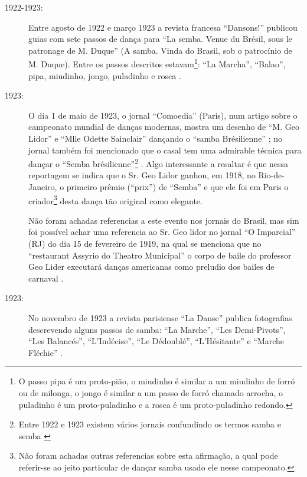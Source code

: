 \begin{description}
\item[1922-1923:] Entre agosto de 1922 e março 1923 a revista francesa ``Dansons!'' 
publicou guias com sete passos de dança para 
``La semba. Venue du Brésil, sous le patronage de M. Duque'' (A samba. Vinda do Brasil, sob o patrocínio de M. Duque).
Entre os passos descritos estavam\footnote{O passo pipa é um proto-pião, 
o miudinho é similar a um miudinho de forró ou de milonga,
o jongo é similar a um passo de forró chamado arrocha,
o puladinho é um proto-puladinho e 
a rosca é um proto-puladinho redondo.
}: 
``La Marcha'', %
``Balao'', 
pipa, %
miudinho, %
jongo, %
puladinho e %
rosca %
\cite[pp. 3]{Dansons:12} \cite[pp. 3]{Dansons:13} \cite[pp. 3]{Dansons:14} \cite[pp. 3]{Dansons:15} \cite[pp. 7]{Dansons:25}.

\item[1923:] O dia 1 de maio de 1923, o jornal ``Comoedia'' (Paris),
num artigo sobre o campeonato mundial de danças modernas,  
mostra um desenho de ``M. Geo Lidor'' e ``Mlle Odette Sainclair'' 
dançando o ``samba Brésilienne'' \cite[pp. 1]{Comoedia:1923:maio:1}; 
no jornal também foi mencionado que o casal tem uma admirable técnica para dançar o 
``Semba brésilienne''\footnote{Entre 1922 e 1923 existem vários jornais 
confundindo os termos samba e semba \cite[pp. 1-2]{Comoedia:1923:maio:1}} \cite[pp. 2]{Comoedia:1923:maio:1}.
Algo interessante a resaltar é que nessa reportagem se indica 
que o Sr. Geo Lidor ganhou, em 1918, 
no Rio-de-Janeiro, o primeiro prêmio (``prix'') de ``Semba'' e que 
ele foi em Paris o criador\footnote{Não foram achadas outras referencias sobre esta afirmação, 
a qual pode referir-se ao jeito particular de dançar samba usado ele nesse campeonato.} desta dança tão original como elegante.

Não foram achadas referencias a este evento nos jornais do Brasil, mas
sim foi possível achar uma referencia ao Sr. Geo lidor
no jornal ``O Imparcial''  (RJ)
do dia 15 de fevereiro de 1919, na qual se menciona que
no ``restaurant Assyrio do Theatro Municipal''
o corpo de baile do professor Geo Lider executará danças americanas 
como preludio dos bailes de carnaval \cite[pp. 7]{Imparcial:1919:Fevereiro:15}.

\item[1923:] No novembro de 1923 a revista parisiense ``La Danse'' publica fotografias descrevendo %
alguns passos de samba: %
``La Marche'', ``Les Demi-Pivots'', ``Les Balancés'', ``L'Indécise'', ``Le Dédoublé'', 
``L'Hésitante'' e ``Marche Fléchie'' \cite[pp. 10]{LaDanse:38}.


\end{description}
